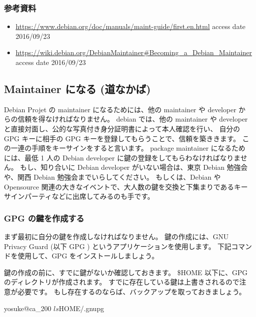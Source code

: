 \documentclass[mingoth,a4paper]{jsarticle}
\begin{document}
\subsubsection{ 参考資料 }
\begin{itemize}
    \item{\url{https://www.debian.org/doc/manuals/maint-guide/first.en.html} access date 2016/09/23 }
    \item{\url{https://wiki.debian.org/DebianMaintainer#Becoming_a_Debian_Maintainer} access date 2016/09/23 }
\end{itemize}

\subsection{ Maintainer になる (道なかば) }

Debian Projet の maintainer になるためには、他の maintainer や developer からの信頼を得なければなりません。
debian では、他の maintainer や developer と直接対面し、公的な写真付き身分証明書によって本人確認を行い、
自分の GPG キーに相手の GPG キーを登録してもらうことで、信頼を築ききます。
この一連の手順をキーサインをすると言います。
package maintainer になるためには、最低 1 人の Debian developer に鍵の登録をしてもらわなければなりません。
もし、知り合いに Debian developer がいない場合は、東京 Debian 勉強会や、関西 Debian 勉強会までいらしてください。
もしくは、Debian や Opensource 関連の大きなイベントで、大人数の鍵を交換と下集まりであるキーサインパーティなどに出席してみるのも手です。

\subsubsection{ GPG の鍵を作成する }

まず最初に自分の鍵を作成しなければなりません。
鍵の作成には、GNU Privacy Guard (以下 GPG ) というアプリケーションを使用します。
下記コマンドを使用して、GPG をインストールしましょう。

鍵の作成の前に、すでに鍵がないか確認しておきます。
\$HOME 以下に、GPG のディレクトリが作成されます。 すでに存在している鍵は上書きされるので注意が必要です。
もし存在するのならば、バックアップを取っておきましょう。
\begin{commandline}
yosuke@ca_200 $ ls $HOME/.gnupg 
\end{commandline}
\end{document}
